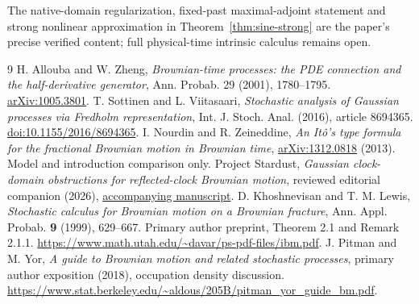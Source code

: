 \documentclass[11pt]{article}
\begin{document}
The native-domain regularization, fixed-past maximal-adjoint statement
and strong nonlinear approximation in Theorem~\ref{thm:sine-strong} are the paper's precise
verified content; full physical-time intrinsic calculus remains open.
\par\endgroup

\begingroup\small
\begin{thebibliography}{9}
 H. Allouba and W. Zheng,
\emph{Brownian-time processes: the PDE connection and the half-derivative
generator}, Ann. Probab. 29 (2001), 1780--1795.
\href{https://arxiv.org/abs/1005.3801}{arXiv:1005.3801}.
 T. Sottinen and L. Viitasaari,
\emph{Stochastic analysis of Gaussian processes via Fredholm representation},
Int. J. Stoch. Anal. (2016), article 8694365.
\href{https://doi.org/10.1155/2016/8694365}{doi:10.1155/2016/8694365}.
 I. Nourdin and R. Zeineddine,
\emph{An It\^o's type formula for the fractional Brownian motion in
Brownian time}, \href{https://arxiv.org/abs/1312.0818}{arXiv:1312.0818}
(2013). Model and introduction comparison only.
 Project Stardust,
\emph{Gaussian clock-domain obstructions for reflected-clock Brownian
motion}, reviewed editorial companion (2026),
\href{../ibm-clock-domain/main.pdf}{accompanying manuscript}.
 D. Khoshnevisan and T. M. Lewis,
\emph{Stochastic calculus for Brownian motion on a Brownian fracture},
Ann. Appl. Probab. \textbf{9} (1999), 629--667.
Primary author preprint, Theorem 2.1 and Remark 2.1.1.
\url{https://www.math.utah.edu/~davar/ps-pdf-files/ibm.pdf}.
 J. Pitman and M. Yor,
\emph{A guide to Brownian motion and related stochastic processes},
primary author exposition (2018), occupation density discussion.
\url{https://www.stat.berkeley.edu/~aldous/205B/pitman_yor_guide_bm.pdf}.
\end{thebibliography}
\endgroup
\end{document}
